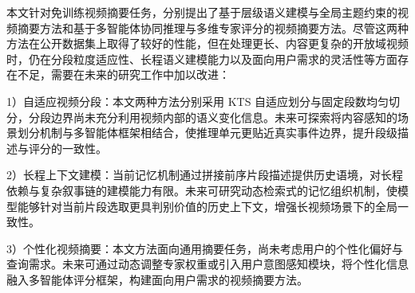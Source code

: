 本文针对免训练视频摘要任务，分别提出了基于层级语义建模与全局主题约束的视频摘要方法和基于多智能体协同推理与多维专家评分的视频摘要方法。尽管这两种方法在公开数据集上取得了较好的性能，但在处理更长、内容更复杂的开放域视频时，仍在分段粒度适应性、长程语义建模能力以及面向用户需求的灵活性等方面存在不足，需要在未来的研究工作中加以改进：

1）自适应视频分段：本文两种方法分别采用 KTS 自适应划分与固定段数均匀切分，分段边界尚未充分利用视频内部的语义变化信息。未来可探索将内容感知的场景划分机制与多智能体框架相结合，使推理单元更贴近真实事件边界，提升段级描述与评分的一致性。

2）长程上下文建模：当前记忆机制通过拼接前序片段描述提供历史语境，对长程依赖与复杂叙事链的建模能力有限。未来可研究动态检索式的记忆组织机制，使模型能够针对当前片段选取更具判别价值的历史上下文，增强长视频场景下的全局一致性。

3）个性化视频摘要：本文方法面向通用摘要任务，尚未考虑用户的个性化偏好与查询需求。未来可通过动态调整专家权重或引入用户意图感知模块，将个性化信息融入多智能体评分框架，构建面向用户需求的视频摘要方法。